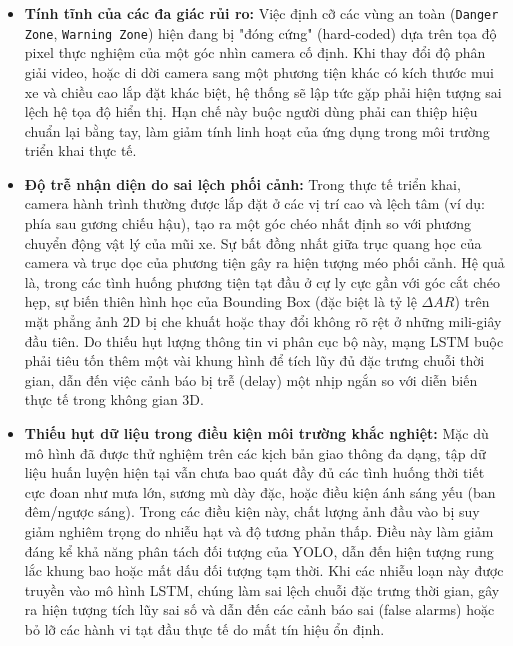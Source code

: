 	\begin{itemize}
		\item \textbf{Tính tĩnh của các đa giác rủi ro:} Việc định cỡ các vùng an toàn (\texttt{Danger Zone}, \texttt{Warning Zone}) hiện đang bị "đóng cứng" (hard-coded) dựa trên tọa độ pixel thực nghiệm của một góc nhìn camera cố định. Khi thay đổi độ phân giải video, hoặc di dời camera sang một phương tiện khác có kích thước mui xe và chiều cao lắp đặt khác biệt, hệ thống sẽ lập tức gặp phải hiện tượng sai lệch hệ tọa độ hiển thị. Hạn chế này buộc người dùng phải can thiệp hiệu chuẩn lại bằng tay, làm giảm tính linh hoạt của ứng dụng trong môi trường triển khai thực tế.
		
		\item \textbf{Độ trễ nhận diện do sai lệch phối cảnh:} Trong thực tế triển khai, camera hành trình thường được lắp đặt ở các vị trí cao và lệch tâm (ví dụ: phía sau gương chiếu hậu), tạo ra một góc chéo nhất định so với phương chuyển động vật lý của mũi xe. Sự bất đồng nhất giữa trục quang học của camera và trục dọc của phương tiện gây ra hiện tượng méo phối cảnh. Hệ quả là, trong các tình huống phương tiện tạt đầu ở cự ly cực gần với góc cắt chéo hẹp, sự biến thiên hình học của Bounding Box (đặc biệt là tỷ lệ $\Delta AR$) trên mặt phẳng ảnh 2D bị che khuất hoặc thay đổi không rõ rệt ở những mili-giây đầu tiên. Do thiếu hụt lượng thông tin vi phân cục bộ này, mạng LSTM buộc phải tiêu tốn thêm một vài khung hình để tích lũy đủ đặc trưng chuỗi thời gian, dẫn đến việc cảnh báo bị trễ (delay) một nhịp ngắn so với diễn biến thực tế trong không gian 3D.
	
		\item \textbf{Thiếu hụt dữ liệu trong điều kiện môi trường khắc nghiệt:} Mặc dù mô hình đã được thử nghiệm trên các kịch bản giao thông đa dạng, tập dữ liệu huấn luyện hiện tại vẫn chưa bao quát đầy đủ các tình huống thời tiết cực đoan như mưa lớn, sương mù dày đặc, hoặc điều kiện ánh sáng yếu (ban đêm/ngược sáng). Trong các điều kiện này, chất lượng ảnh đầu vào bị suy giảm nghiêm trọng do nhiễu hạt và độ tương phản thấp. Điều này làm giảm đáng kể khả năng phân tách đối tượng của YOLO, dẫn đến hiện tượng rung lắc khung bao hoặc mất dấu đối tượng tạm thời. Khi các nhiễu loạn này được truyền vào mô hình LSTM, chúng làm sai lệch chuỗi đặc trưng thời gian, gây ra hiện tượng tích lũy sai số và dẫn đến các cảnh báo sai (false alarms) hoặc bỏ lỡ các hành vi tạt đầu thực tế do mất tín hiệu ổn định.
	\end{itemize}
	
